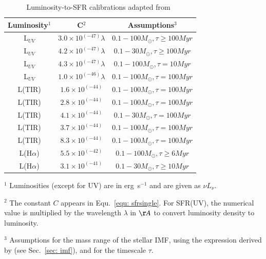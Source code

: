 \begin{table}
\centering
\caption{Luminosity-to-SFR calibrations adapted from~\cite{Calzetti13}}
\label{table1}
\begin{tabular}{ c c c }
\hline\hline
Luminosity$^1$ & C$^2$ & Assumptions$^3$\\
\hline
L$_{UV}$ & $3.0 \times 10^{(-47)} \lambda$ &$0.1 -100 M_{\odot}, \tau \ge 100 Myr $\\
L$_{UV}$ & $4.2 \times 10^{(-47)} \lambda$ &$0.1 -30 M_{\odot}, \tau \ge 100 Myr $\\
L$_{UV}$ & $4.3 \times 10^{(-47)}\lambda$ &$0.1 -100 M_{\odot}, \tau = 10 Myr $\\
L$_{UV}$ & $1.0 \times 10^{(-46)}\lambda$ &$0.1 -100 M_{\odot}, \tau = 100 Myr $\\
L(TIR) & $1.6 \times 10^{(-44)}$ &$0.1 -100 M_{\odot}, \tau = 100 Myr $\\
L(TIR) & $2.8 \times 10^{(-44)}$ &$0.1 -100 M_{\odot}, \tau = 100 Myr $\\
L(TIR) & $4.1 \times 10^{(-44)}$ &$0.1 -30 M_{\odot}, \tau = 100 Myr $\\
L(TIR) & $3.7 \times 10^{(-44)}$ &$0.1 -100 M_{\odot}, \tau = 100 Myr $\\
L(TIR) & $8.3 \times 10^{(-44)}$ &$0.1 -100 M_{\odot}, \tau = 100 Myr $\\
L(H${\alpha}$) & $5.5 \times 10^{(-42)}$&$0.1 -100 M_{\odot},  \tau \ge 6 Myr $\\
L(H${\alpha}$) & $3.1 \times 10^{(-41)}$&$0.1 -30 M_{\odot},  \tau \ge 10 Myr $\\
\hline
\end{tabular}
\begin{tablenotes}
\item $^1$ Luminosities (except for UV) are in erg~s$^{-1}$ and are given as $\nu L_{\nu}$.
\item $^2$ The constant $C$ appears in Equ.~\ref{equ: sfrsingle}. For SFR(UV), the numerical value is multiplied by the wavelength $\lambda$ in $\AA$ to convert luminosity density to luminosity. %
\item $^3$ Assumptions for the mass range of the stellar IMF, using the expression derived by \cite{Kroupa01} (see Sec.~\ref{sec: imf}), and for the timescale $\tau$.
\end{tablenotes}
\end{table}


